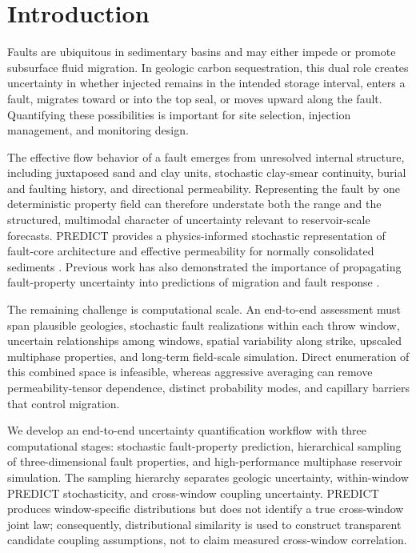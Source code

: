 
\section{Introduction}

Faults are ubiquitous in sedimentary basins and may either impede or promote
subsurface fluid migration. In geologic carbon sequestration, this dual role
creates uncertainty in whether injected \coTwo{} remains in the intended
storage interval, enters a fault, migrates toward or into the top seal, or
moves upward along the fault. Quantifying these possibilities is important for
site selection, injection management, and monitoring design.

The effective flow behavior of a fault emerges from unresolved internal
structure, including juxtaposed sand and clay units, stochastic clay-smear
continuity, burial and faulting history, and directional permeability.
Representing the fault by one deterministic property field can therefore
understate both the range and the structured, multimodal character of
uncertainty relevant to reservoir-scale forecasts. PREDICT provides a
physics-informed stochastic representation of fault-core architecture and
effective permeability for normally consolidated sediments
\cite{SaloSalgado2025}. Previous work has also demonstrated the importance of
propagating fault-property uncertainty into predictions of \coTwo{} migration
and fault response \cite{Lu2025}.

The remaining challenge is computational scale. An end-to-end assessment must
span plausible geologies, stochastic fault realizations within each throw
window, uncertain relationships among windows, spatial variability along
strike, upscaled multiphase properties, and long-term field-scale simulation.
Direct enumeration of this combined space is infeasible, whereas aggressive
averaging can remove permeability-tensor dependence, distinct probability
modes, and capillary barriers that control migration.

We develop an end-to-end uncertainty quantification workflow with three
computational stages: stochastic fault-property prediction, hierarchical
sampling of three-dimensional fault properties, and high-performance
multiphase reservoir simulation. The sampling hierarchy separates geologic
uncertainty, within-window PREDICT stochasticity, and cross-window coupling
uncertainty. PREDICT produces window-specific distributions but does not
identify a true cross-window joint law; consequently, distributional
similarity is used to construct transparent candidate coupling assumptions,
not to claim measured cross-window correlation.

